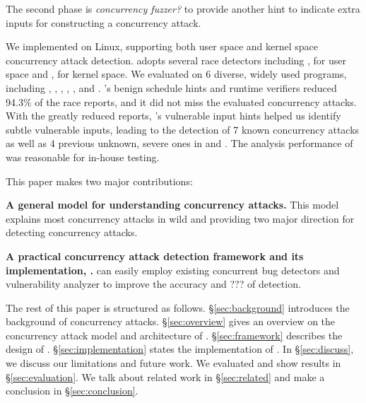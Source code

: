 The second phase is \emph{concurrency fuzzer?} to provide another hint to 
indicate extra inputs for constructing a concurrency attack. 
 


We implemented \xxx on Linux, supporting both user space and kernel space concurrency attack detection. 
\xxx adopts several race detectors including \tsan, \valgrind for user space and 
\ktsan, \ski for kernel space. We evaluated \xxx on 6 diverse, widely used programs, including \apache, \chrome, \libsafe, \linux, \mysql,
and \ssdb. \xxx’s benign schedule hints and runtime verifiers reduced 94.3\% of the race reports, 
and it did not miss the evaluated concurrency attacks. With the greatly reduced reports,
\xxx’s vulnerable input hints helped us identify subtle
vulnerable inputs, leading to the detection of 7 known concurrency
attacks as well as 4 previous unknown, severe ones
in \ssdb and \apache. The analysis performance of \xxx was
reasonable for in-house testing.


This paper makes two major contributions:

\begin{tightenum}
\item \textbf{A general model for understanding concurrency attacks.} 
This model explains most concurrency attacks in wild and 
providing two major direction for detecting concurrency attacks. 
	
\item \textbf{A practical concurrency attack detection framework and its implementation, \xxx.} 
\xxx can easily employ existing concurrent bug detectors and vulnerability analyzer 
to improve the accuracy and ??? of detection.
	
\end{tightenum}

 

The rest of this paper is structured as follows. 
\S\ref{sec:background} introduces the background of concurrency attacks.
\S\ref{sec:overview} gives an overview on the concurrency attack model and architecture of \xxx.
\S\ref{sec:framework} describes the design of \xxx. 
\S\ref{sec:implementation} states the implementation of \xxx.
In \S\ref{sec:discuss}, we discuss our limitations and future work. 
We evaluated \xxx and show results in \S\ref{sec:evaluation}.
We talk about related work in \S\ref{sec:related} and make a conclusion in \S\ref{sec:conclusion}.





